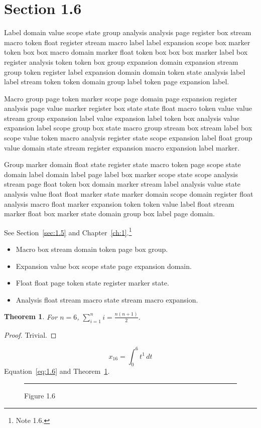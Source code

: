 \documentclass[11pt,twoside]{book}
\newtheorem{theorem}{Theorem}[chapter]
\begin{document}
\section{Section 1.6}\label{sec:1.6}
Label domain value scope state group analysis analysis page register box stream macro token float register stream macro label label expansion scope box marker token box box macro domain marker float token box box box marker label box register analysis token token box group expansion domain expansion stream group token register label expansion domain domain token state analysis label label stream token token domain group label token page expansion label.

Macro group page token marker scope page domain page expansion register analysis page value marker register box state state float macro token value value stream group expansion label value expansion label token box analysis value expansion label scope group box state macro group stream box stream label box scope value token macro analysis register state scope expansion label float group value domain state stream register expansion macro expansion label marker.

Group marker domain float state register state macro token page scope state domain label domain label page label box marker scope state scope analysis stream page float token box domain marker stream label analysis value state analysis value float float marker state marker domain scope domain register float analysis macro float marker expansion token token value label float stream marker float box marker state domain group box label page domain.

See Section~\ref{sec:1.5} and Chapter~\ref{ch:1}.\footnote{Note 1.6.}
\begin{itemize}\item Macro box stream domain token page box group.\item Expansion value box scope state page expansion domain.\item Float float page token state register marker state.\item Analysis float stream macro state stream macro expansion.\end{itemize}
\begin{theorem}\label{thm:1.6}For $n=6$, $\sum_{i=1}^{n}i=\frac{n(n+1)}{2}$.\end{theorem}\begin{proof}Trivial.\end{proof}
\begin{equation}x_{16}=\int_0^{6}t^{1}\,dt\label{eq:1.6}\end{equation} Equation~\eqref{eq:1.6} and Theorem~\ref{thm:1.6}.
\begin{figure}[ht]\centering\rule{4cm}{2cm}\caption{Figure 1.6}\label{fig:1.6}\end{figure}
\end{document}
